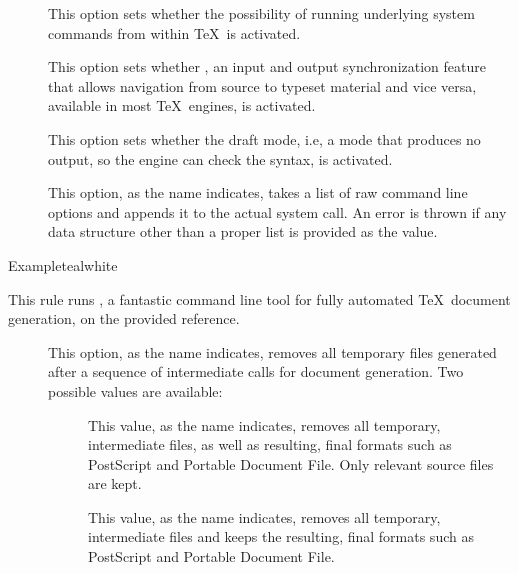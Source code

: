 \begin{description}
\begin{description}
\item[] This option sets whether the possibility of running underlying system commands from within \TeX\ is activated.

\item[] This option sets whether , an input and output synchronization feature that allows navigation from source to typeset material and vice versa, available in most \TeX\ engines, is activated.

\item[] This option sets whether the draft mode, i.e, a mode that produces no output, so the engine can check the syntax, is activated.

\item[] This option, as the name indicates, takes a list of raw command line options and appends it to the actual system call. An error is thrown if any data structure other than a proper list is provided as the value.
\end{description}

\begin{codebox}{Example}{teal}{\icnote}{white}
\end{codebox}

\item[\rulebox{latexmk}]
This rule runs , a fantastic command line tool for fully automated \TeX\ document generation, on the provided  reference.

\begin{description}
\item[] This option, as the name indicates, removes all temporary files generated after a sequence of intermediate calls for document generation. Two possible values are available:

\begin{description}
\item[] This value, as the name indicates, removes all temporary, intermediate files, as well as resulting, final formats such as PostScript and Portable Document File. Only relevant source files are kept.

\item[] This value, as the name indicates, removes all temporary, intermediate files and keeps the resulting, final formats such as PostScript and Portable Document File.
\end{description}


\end{description}
\end{description}
